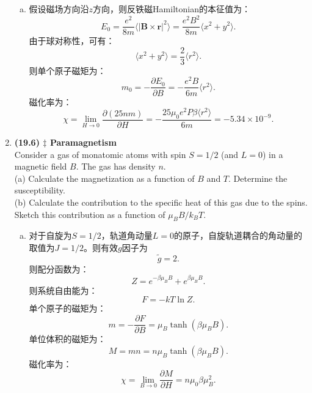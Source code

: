 \documentclass[reqno,a4paper,12pt]{amsart}
\begin{document}
\begin{enumerate}[1.]
\begin{tcolorbox}[breakable, colframe = black, colback = black!5!white]
\begin{enumerate}[(a)]
\item 假设磁场方向沿$z$方向，则反铁磁Hamiltonian的本征值为：
\[
	E_0 = \frac{e^2}{8m} \langle \vert \mathbf{B} \times \mathbf{r} \vert^2 \rangle = \frac{e^2B^2}{8m}\langle x^2 + y^2 \rangle.
\]
由于球对称性，可有：
\[
	\langle x^2+y^2 \rangle = \frac{2}{3}\langle r^2 \rangle.
\]
则单个原子磁矩为：
\[
	m_0 = -\frac{\partial E_0}{\partial B} = -\frac{e^2B}{6m}\langle r^2 \rangle.
\]
磁化率为：
\[
	\chi = \lim_{H\to 0} \frac{\partial (25nm)}{\partial H} = -\frac{25\mu_0e^2P\beta\langle r^2 \rangle}{6m} = -5.34\times 10^{-9}.
\]
\end{enumerate}
\end{tcolorbox}

\item \textbf{(19.6) $\ddagger$ Paramagnetism} \\
Consider a gas of monatomic atoms with spin $S = 1/2$ (and $L=0$) in a magnetic field $B$. The gas has density $n$. \\
(a) Calculate the magnetization as a function of $B$ and $T$. Determine the susceptibility. \\
(b) Calculate the contribution to the specific heat of this gas due to the spins. Sketch this contribution as a function of $\mu_BB/k_BT$.
\begin{tcolorbox}[breakable, colback = black!5!white, colframe = black]
\begin{enumerate}[(a)]

\item 对于自旋为$S = 1/2$，轨道角动量$L=0$的原子，自旋轨道耦合的角动量的取值为$J=1/2$。则有效$g$因子为
\[
	\tilde{g} = 2.
\]
则配分函数为：
\[
	Z = e^{-\beta\mu_BB} + e^{\beta\mu_BB}.
\]
则系统自由能为：
\[
	F = -kT\ln Z.
\]
单个原子的磁矩为：
\[
	m = -\frac{\partial F}{\partial B} = \mu_B \tanh(\beta\mu_BB).
\]
单位体积的磁矩为：
\[
	M = mn = n\mu_B\tanh(\beta\mu_BB).
\]
磁化率为：
\[
	\chi = \lim_{B\to0} \frac{\partial M }{\partial H} = n\mu_0 \beta\mu_B^2.
\]


\end{enumerate}
\end{tcolorbox}
\end{enumerate}
\end{document}

